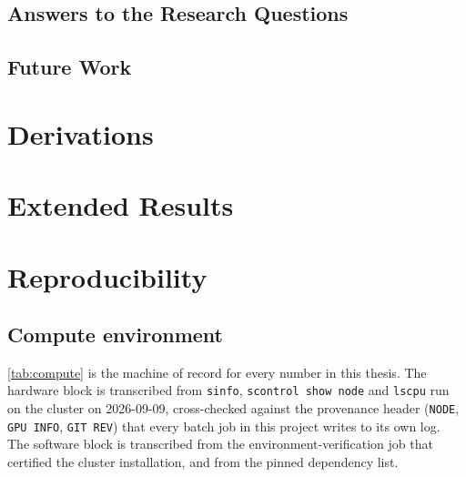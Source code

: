 \documentclass[headsepline,footsepline,footinclude=false,oneside,fontsize=11pt,paper=a4,listof=totoc,bibliography=totoc]{scrbook}
\theoremstyle{definition}
\theoremstyle{plain}
\theoremstyle{remark}
\begin{document}
\section{Answers to the Research Questions}\label{sec:conc:rqs}
\section{Future Work}\label{sec:conc:future}

\appendix{}

\chapter{Derivations}\label{app:derivations}
\chapter{Extended Results}\label{app:results}
\chapter{Reproducibility}\label{app:repro}

\section*{Compute environment}

\autoref{tab:compute} is the machine of record for every number in this thesis. The hardware block
is transcribed from \texttt{sinfo}, \texttt{scontrol show node} and \texttt{lscpu} run on the cluster
on 2026-09-09, cross-checked against the provenance header (\texttt{NODE}, \texttt{GPU INFO},
\texttt{GIT REV}) that every batch job in this project writes to its own log. The software block is
transcribed from the environment-verification job that certified the cluster installation, and from
the pinned dependency list.
\end{document}
